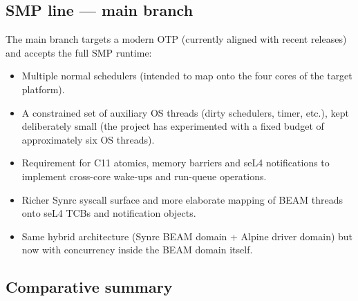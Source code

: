 \documentclass{article}
\begin{document}
\subsection{SMP line --- main branch}

The main branch targets a modern OTP (currently aligned with recent releases) and accepts the full SMP runtime:

\begin{itemize}
  \item Multiple normal schedulers (intended to map onto the four cores of the target platform).
  \item A constrained set of auxiliary OS threads (dirty schedulers, timer, etc.), kept deliberately small (the project has experimented with a fixed budget of approximately six OS threads).
  \item Requirement for C11 atomics, memory barriers and seL4 notifications to implement cross-core wake-ups and run-queue operations.
  \item Richer Synrc syscall surface and more elaborate mapping of BEAM threads onto seL4 TCBs and notification objects.
  \item Same hybrid architecture (Synrc BEAM domain + Alpine driver domain) but now with concurrency inside the BEAM domain itself.
\end{itemize}

\subsection{Comparative summary}

\begin{center}
\noindent{}
\end{center}
\end{document}
